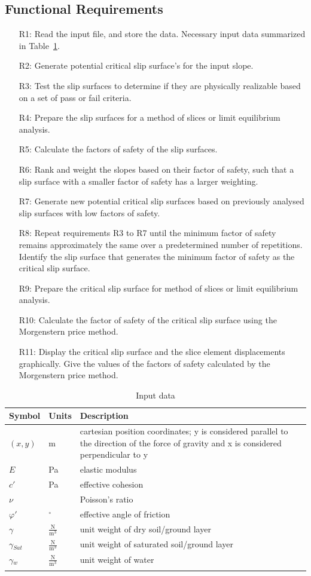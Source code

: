 \documentclass[12pt]{article}
\begin{document}
\subsection{Functional Requirements}
\label{Sec:FR}
\begin{itemize}
\item[R1:]Read the input file, and store the data. Necessary input data summarized in Table~\ref{Table:Id}.
\item[R2:]Generate potential critical slip surface's for the input slope.
\item[R3:]Test the slip surfaces to determine if they are physically realizable based on a set of pass or fail criteria.
\item[R4:]Prepare the slip surfaces for a method of slices or limit equilibrium analysis.
\item[R5:]Calculate the factors of safety of the slip surfaces.
\item[R6:]Rank and weight the slopes based on their factor of safety, such that a slip surface with a smaller factor of safety has a larger weighting.
\item[R7:]Generate new potential critical slip surfaces based on previously analysed slip surfaces with low factors of safety.
\item[R8:]Repeat requirements R3 to R7 until the minimum factor of safety remains approximately the same over a predetermined number of repetitions. Identify the slip surface that generates the minimum factor of safety as the critical slip surface.
\item[R9:]Prepare the critical slip surface for method of slices or limit equilibrium analysis.
\item[R10:]Calculate the factor of safety of the critical slip surface using the Morgenstern price method.
\item[R11:]Display the critical slip surface and the slice element displacements graphically. Give the values of the factors of safety calculated by the Morgenstern price method.
\end{itemize}
\begin{longtable}{l l l}
\toprule
Symbol & Units & Description
\\
\midrule
$(x,y)$ & m & cartesian position coordinates; y is considered parallel to the direction of the force of gravity and x is considered perpendicular to y
\\
$E$ & Pa & elastic modulus
\\
$c'$ & Pa & effective cohesion
\\
$\nu{}$ &  & Poisson's ratio
\\
$\varphi{}'$ & ${}^{\circ}$ & effective angle of friction
\\
$\gamma{}$ & $\frac{\text{N}}{\text{m}^{3}}$ & unit weight of dry soil/ground layer
\\
$\gamma{}_{Sat}$ & $\frac{\text{N}}{\text{m}^{3}}$ & unit weight of saturated soil/ground layer
\\
$\gamma{}_{w}$ & $\frac{\text{N}}{\text{m}^{3}}$ & unit weight of water
\\
\bottomrule
\caption{Input data}
\label{Table:Id}
\end{longtable}
\end{document}

